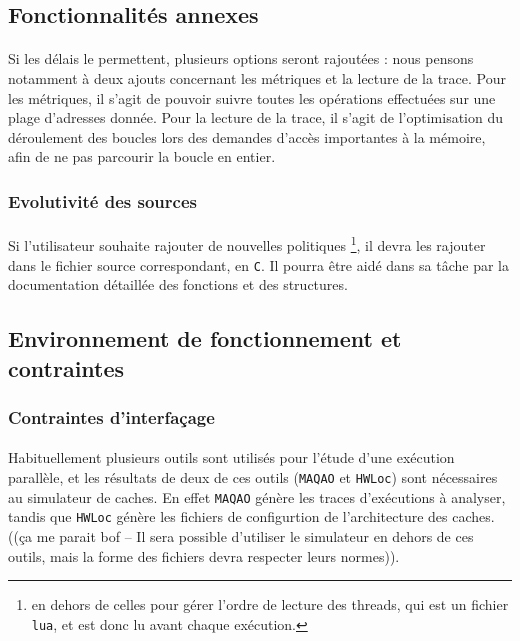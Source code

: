 \subsection{Fonctionnalités annexes}

\paragraph{}
Si les délais le permettent, plusieurs options seront rajoutées : nous pensons notamment à deux ajouts concernant les métriques et la lecture de la trace. Pour les métriques, il s'agit de pouvoir suivre toutes les opérations effectuées sur une plage d'adresses donnée. Pour la lecture de la trace, il s'agit de l'optimisation du déroulement des boucles lors des demandes d'accès importantes à la mémoire, afin de ne pas parcourir la boucle en entier.

\subsubsection{Evolutivité des sources}
\paragraph{}
Si l'utilisateur souhaite rajouter de nouvelles politiques \footnote{en dehors de celles pour gérer l'ordre de lecture des threads, qui est un fichier \texttt{lua}, et est donc lu avant chaque exécution.}, il devra les rajouter dans le fichier source correspondant, en \texttt{C}. Il pourra être aidé dans sa tâche par la documentation détaillée des fonctions et des structures.

\subsection{Environnement de fonctionnement et contraintes}

\subsubsection{Contraintes d'interfaçage}
\paragraph{}
Habituellement plusieurs outils sont utilisés pour l'étude d'une exécution parallèle, et les résultats de deux de ces outils (\texttt{MAQAO} et \texttt{HWLoc}) sont nécessaires au simulateur de caches. En effet \texttt{MAQAO} génère les traces d'exécutions à analyser, tandis que \texttt{HWLoc}
génère les fichiers de configurtion de l'architecture des caches. ((ça me parait bof -- Il sera possible d'utiliser le simulateur en dehors de ces outils, mais la forme des fichiers devra respecter leurs normes)). 

